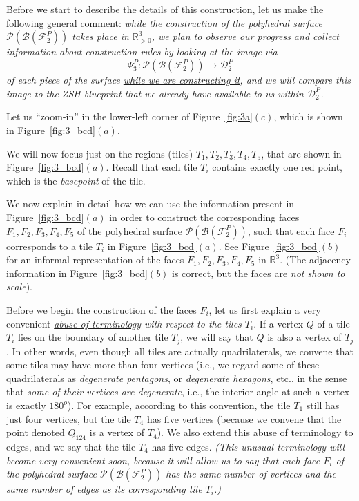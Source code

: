 \documentclass[12pt,letterpaper]{article}
\renewcommand{\P}{\mathcal{P}}
\newcommand{\B}{\mathcal{B}}
\newcommand{\RR}{\mathbb{R}}
\begin{document}
Before we start to  describe the details of this construction, let us make the following general comment: {\em while the construction of the  polyhedral surface $\P(\B(\mathcal{F}_2^P))$ takes place in $\mathbb{R}^3_{>0}$, we plan to observe our progress and collect information about construction rules by looking at the image via 
$$
\Psi_3^P : \P(\B(\mathcal{F}_2^P)) \to \mathscr{D}_2^P
$$ of each piece of the surface \underline{while we are constructing it}, and we will compare this image to the ZSH blueprint that we  already have available to us within $\mathscr{D}_2^P$.}


\bigskip


Let us  ``zoom-in'' in the lower-left corner of Figure~\ref{fig:3a}$(c)$, which is shown in Figure~\ref{fig:3_bcd}$(a)$. 


We will now focus just on the regions (tiles) $T_1, T_2, T_3, T_4, T_5$, that are shown in Figure~\ref{fig:3_bcd}$(a)$. Recall that each tile $T_i$ contains exactly one red point, which is the {\em basepoint} of the tile.



We now explain in  detail how we can use the information present in Figure~\ref{fig:3_bcd}$(a)$ in order to construct the corresponding faces $F_1, F_2, F_3, F_4, F_5$ of the polyhedral surface $\P(\B(\mathcal{F}_2^P))$, such that each face $F_i$ corresponds to a tile $T_i$ in Figure~\ref{fig:3_bcd}$(a)$. See Figure~\ref{fig:3_bcd}$(b)$ for an informal representation of the faces $F_1, F_2, F_3, F_4, F_5$ in $\RR^3$. (The adjacency information in Figure~\ref{fig:3_bcd}$(b)$ is correct, but the faces are {\em not shown to scale}).


\bigskip

Before we begin the construction of the faces $F_i$, let us first explain a very convenient {\em  \underline{abuse of terminology} with respect to the tiles $T_i$}. If a vertex $Q$ of a tile $T_i$ lies on the boundary of another tile  $T_j$, we will say that $Q$ is also a vertex of $T_j$. In other words, even though all tiles are actually quadrilaterals, we convene that some tiles may have more than four vertices (i.e., we regard some of these quadrilaterals as {\em degenerate pentagons}, or {\em degenerate hexagons}, etc., in the sense that {\em some of their vertices are degenerate}, i.e., the interior angle at such a vertex is exactly $180^o$). For example, according to this convention, the tile $T_1$ still has just four vertices, but the tile $T_4$ has \underline{five} vertices (because we convene that the point denoted $Q_{124}$ is a vertex of $T_4$). We also extend this abuse of terminology to edges, and we say that the tile $T_4$ has five edges. {\em (This unusual terminology will become very convenient soon, because it will allow us to say that each face $F_i$ of the polyhedral surface $\P(\B(\mathcal{F}_2^P))$ has the same number of vertices and the same number of edges as its corresponding tile $T_i$.)}
\end{document}
